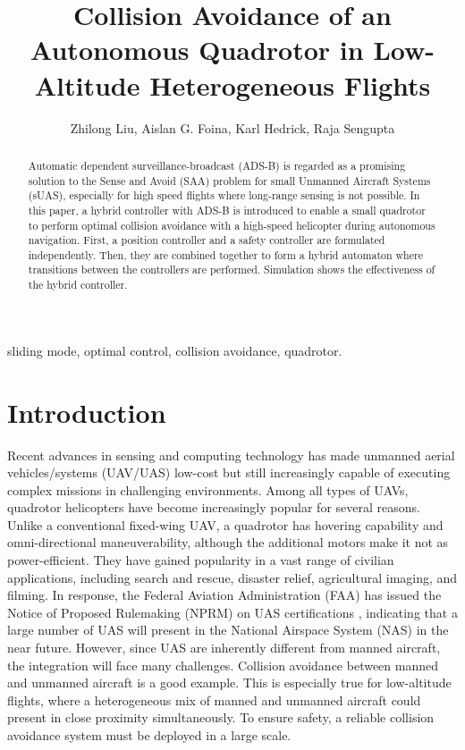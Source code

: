 \documentclass[journal,11pt,onecolumn,draftclsnofoot,]{IEEEtran}
\begin{document}
\title{Collision Avoidance of an Autonomous Quadrotor in Low-Altitude Heterogeneous Flights}

\author{Zhilong Liu, Aislan G. Foina, Karl Hedrick, Raja Sengupta}


\maketitle
{}

\begin{abstract}
Automatic dependent surveillance-broadcast (ADS-B) is regarded as a promising solution to the Sense and Avoid (SAA) problem for small Unmanned Aircraft Systems (sUAS), especially for high speed flights where long-range sensing is not possible. In this paper, a hybrid controller with ADS-B is introduced to enable a small quadrotor to perform optimal collision avoidance with a high-speed helicopter during autonomous navigation. First, a position controller and a safety controller are formulated independently. Then, they are combined together to form a hybrid automaton where transitions between the controllers are performed. Simulation shows the effectiveness of the hybrid controller.
\end{abstract}

\begin{IEEEkeywords}
sliding mode, optimal control, collision avoidance, quadrotor.
\end{IEEEkeywords}


\section{\textbf{Introduction}}

Recent advances in sensing and computing technology has made unmanned aerial vehicles/systems (UAV/UAS) low-cost but still increasingly capable of executing complex missions in challenging environments. Among all types of UAVs, quadrotor helicopters have become increasingly popular for several reasons. Unlike a conventional fixed-wing UAV, a quadrotor has hovering capability and omni-directional maneuverability, although the additional motors make it not as power-efficient. They have gained popularity in a vast range of civilian applications, including search and rescue, disaster relief, agricultural imaging, and filming. In response, the Federal Aviation Administration (FAA) has issued the Notice of Proposed Rulemaking (NPRM) on UAS certifications \cite{faa-nprm}, indicating that a large number of UAS will present in the National Airspace System (NAS) in the near future. However, since UAS are inherently different from manned aircraft, the integration will face many challenges. Collision avoidance between manned and unmanned aircraft is a good example. This is especially true for low-altitude flights, where a heterogeneous mix of manned and unmanned aircraft could present in close proximity simultaneously. To ensure safety, a reliable collision avoidance system must be deployed in a large scale.
\end{document}
